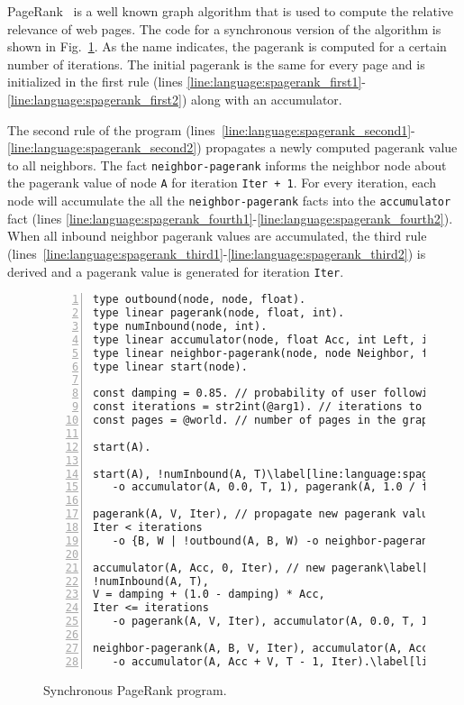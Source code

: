 PageRank~\cite{Page:2001:MNR} is a well known graph algorithm that is used to
compute the relative relevance of web pages.  The code for a synchronous version
of the algorithm is shown in Fig.~\ref{language:code:pagerank}. As the name
indicates, the pagerank is computed for a certain number of iterations. The
initial pagerank is the same for every page and is initialized in the first rule
(lines
\ref{line:language:spagerank_first1}-\ref{line:language:spagerank_first2}) along
with an accumulator.

The second rule of the program
(lines~\ref{line:language:spagerank_second1}-\ref{line:language:spagerank_second2})
propagates a newly computed pagerank value to all neighbors. The fact
\texttt{neighbor-pagerank} informs the neighbor node about the pagerank value of
node \texttt{A} for iteration \texttt{Iter + 1}. For every iteration, each node
will accumulate the all the \texttt{neighbor-pagerank} facts into the
\texttt{accumulator} fact (lines
\ref{line:language:spagerank_fourth1}-\ref{line:language:spagerank_fourth2}).
When all inbound neighbor pagerank values are accumulated, the third rule
(lines~\ref{line:language:spagerank_third1}-\ref{line:language:spagerank_third2})
is derived and a pagerank value is generated for iteration \texttt{Iter}.

\begin{figure}[h!]
\begin{Verbatim}[numbers=left,fontsize=\codesize,commandchars=\\\[\]]
type outbound(node, node, float).
type linear pagerank(node, float, int).
type numInbound(node, int).
type linear accumulator(node, float Acc, int Left, int Iteration).
type linear neighbor-pagerank(node, node Neighbor, float Rank, int Iteration).
type linear start(node).

const damping = 0.85. // probability of user following a link in the current page.
const iterations = str2int(@arg1). // iterations to compute.
const pages = @world. // number of pages in the graph.

start(A).

start(A), !numInbound(A, T)\label[line:language:spagerank_first1]
   -o accumulator(A, 0.0, T, 1), pagerank(A, 1.0 / float(pages), 0).\label[line:language:spagerank_first2]

pagerank(A, V, Iter), // propagate new pagerank value\label[line:language:spagerank_second1]
Iter < iterations
   -o {B, W | !outbound(A, B, W) -o neighbor-pagerank(B, A, V * W, Iter + 1)}.\label[line:language:spagerank_second2]

accumulator(A, Acc, 0, Iter), // new pagerank\label[line:language:spagerank_third1]
!numInbound(A, T),
V = damping + (1.0 - damping) * Acc,
Iter <= iterations
   -o pagerank(A, V, Iter), accumulator(A, 0.0, T, Iter + 1).\label[line:language:spagerank_third2]
	
neighbor-pagerank(A, B, V, Iter), accumulator(A, Acc, T, Iter)\label[line:language:spagerank_fourth1]
   -o accumulator(A, Acc + V, T - 1, Iter).\label[line:language:spagerank_fourth2]
\end{Verbatim}
\caption{Synchronous PageRank program.}
\label{language:code:pagerank}
\end{figure}

